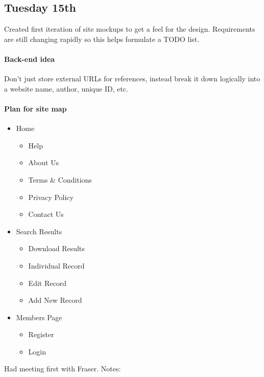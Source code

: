 \subsection{Tuesday 15th}
Created first iteration of site mockups to get a feel for the
design. Requirements are still changing rapidly so this helps formulate a TODO
list.

\paragraph{Back-end idea} Don't just store external URLs for references, instead
break it down logically into a website name, author, unique ID, etc.

\paragraph{Plan for site map}
\begin{itemize}
\item Home
  \begin{itemize}
  \item Help
  \item About Us
  \item Terms \& Conditions
  \item Privacy Policy
  \item Contact Us
  \end{itemize}
\item Search Results
  \begin{itemize}
  \item Download Results
  \item Individual Record
  \item Edit Record
  \item Add New Record
  \end{itemize}
\item Members Page
  \begin{itemize}
  \item Register
  \item Login
  \end{itemize}
\end{itemize}

\noindent
Had meeting first with Fraser. Notes:

